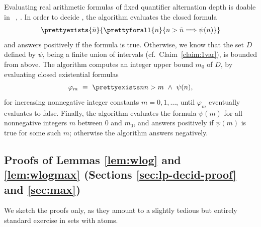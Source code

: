 Evaluating real arithmetic formulas of fixed quantifier alternation depth is doable in \EXPTIME~\cite{Ben-OrKR86}, 
\cite[Theorem 14.16]{ra-book}.
%
In order to decide \polyineqsolvname, the algorithm evaluates the closed formula
\begin{align*} %
\prettyexists{\tilde n}{\prettyforall{n}{n >\tilde n {\implies} \psi(n)}}
%
\end{align*}
and answers positively if the formula is true.
Otherwise, we know that the set $D$ defined by $\psi$, being a finite union of intervals (cf.~Claim~\ref{claim:1var}), 
is bounded from above.
The algorithm computes an integer upper bound $m_0$ of $D$, by evaluating closed existential formulas
\[
\varphi_m \ \equiv \ \prettyexists n  {n > m \ \land \ \psi(n)},
\]
for increasing nonnegative integer constants $m = 0, 1, \ldots$,
until $\varphi_m$ eventually evaluates to false.
Finally, the algorithm evaluates the formula $\psi(m)$ for all nonnegative integers $m$ between $0$ and $m_0$,
and answers positively if $\psi(m)$ is true for some such $m$; otherwise the algorithm answers negatively.



\subsection{Proofs of Lemmas \ref{lem:wlog} and \ref{lem:wlogmax} (Sections \ref{sec:lp-decid-proof} and \ref{sec:max})}
\label{sec:lp-decid-proof-proofs}


%
We sketch the proofs only, as they amount to a slightly tedious but entirely standard exercise in sets with atoms.

